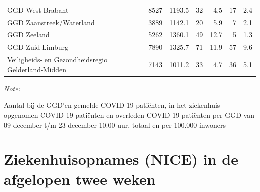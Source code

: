 \documentclass[
  english,
  man,floatsintext]{apa6}
\begin{document}
\begin{table}
\begin{threeparttable}
\begin{tabular}{lrrrrrr}
GGD West-Brabant & 8527 & 1193.5 & 32 & 4.5 & 17 & 2.4\\
GGD Zaanstreek/Waterland & 3889 & 1142.1 & 20 & 5.9 & 7 & 2.1\\
GGD Zeeland & 5262 & 1360.1 & 49 & 12.7 & 5 & 1.3\\
GGD Zuid-Limburg & 7890 & 1325.7 & 71 & 11.9 & 57 & 9.6\\
Veiligheids- en Gezondheidsregio Gelderland-Midden & 7143 & 1011.2 & 33 & 4.7 & 36 & 5.1\\
\bottomrule
\end{tabular}
\begin{tablenotes}
\item \textit{Note: } 
\item Aantal bij de GGD’en gemelde COVID-19 patiënten, in het ziekenhuis opgenomen COVID-19 patiënten en overleden COVID-19 patiënten per GGD van 09 december t/m 23 december 10:00 uur, totaal en per 100.000 inwoners
\end{tablenotes}
\end{threeparttable}
\endgroup{}
\end{table}

\newpage

\hypertarget{ziekenhuisopnames-nice-in-de-afgelopen-twee-weken}{%
\section{Ziekenhuisopnames (NICE) in de afgelopen twee weken}\label{ziekenhuisopnames-nice-in-de-afgelopen-twee-weken}}
\end{document}
